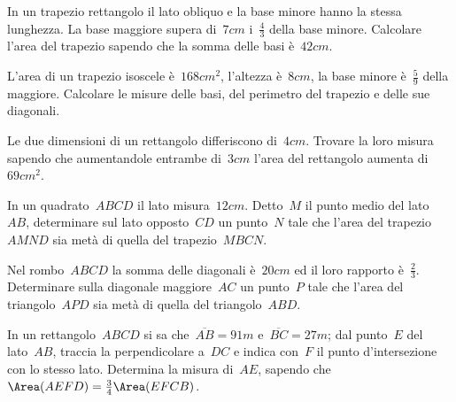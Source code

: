 \begin{multicols}{2}
\begin{esercizio}[\Ast]
In un trapezio rettangolo il lato obliquo e la base minore hanno la stessa lunghezza. La base maggiore supera di~$7\unit{cm}$ i~$\frac{4}{3}$ della base minore. Calcolare l'area del trapezio sapendo che la somma delle basi è~$42\unit{cm}$.
\end{esercizio}

\begin{esercizio}[\Ast]
L'area di un trapezio isoscele è~$168\unit{cm^2}$, l'altezza è~$8\unit{cm}$, la base minore è~$\frac{5}{9}$ della maggiore. Calcolare le misure delle basi, del perimetro del trapezio e delle sue diagonali.
\end{esercizio}

\begin{esercizio}[\Ast]
Le due dimensioni di un rettangolo differiscono di~$4\unit{cm}$. Trovare la loro misura sapendo che aumentandole entrambe di~$3\unit{cm}$ l'area del rettangolo aumenta di~$69\unit{cm^2}$.
\end{esercizio}

\begin{esercizio}[\Ast]
In un quadrato~$ABCD$ il lato misura~$12\unit{cm}$. Detto~$M$ il punto medio del lato~$AB$, determinare sul lato opposto~$CD$ un punto~$N$ tale che l'area del trapezio~$AMND$ sia metà di quella del trapezio~$MBCN$.
\end{esercizio}

\begin{esercizio}[\Ast]
Nel rombo~$ABCD$ la somma delle diagonali è~$20\unit{cm}$ ed il loro rapporto è~$\frac{2}{3}$. Determinare sulla diagonale maggiore~$AC$ un punto~$P$ tale che l'area del triangolo~$APD$ sia metà di quella del triangolo~$ABD$.
\end{esercizio}

\begin{esercizio}
In un rettangolo~$ABCD$ si sa che~$\overline{AB}=91\unit{m}$ e~$\overline{BC}=27\unit{m}$; dal punto~$E$ del lato~$AB$, traccia la perpendicolare a~$DC$ e indica con~$F$ il punto d'intersezione con lo stesso lato. Determina la misura di~$AE$, sapendo che~$\Area(AEFD)=\frac{3}{4}\Area(EFCB)$.
\end{esercizio}
\end{multicols}
